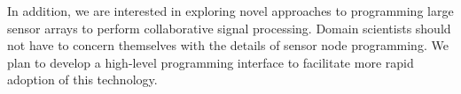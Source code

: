 In addition, we are interested in exploring novel approaches to programming
large sensor arrays to perform collaborative signal processing. Domain
scientists should not have to concern themselves with the details of sensor
node programming. We plan to develop a high-level programming interface to
facilitate more rapid adoption of this technology. 

%

